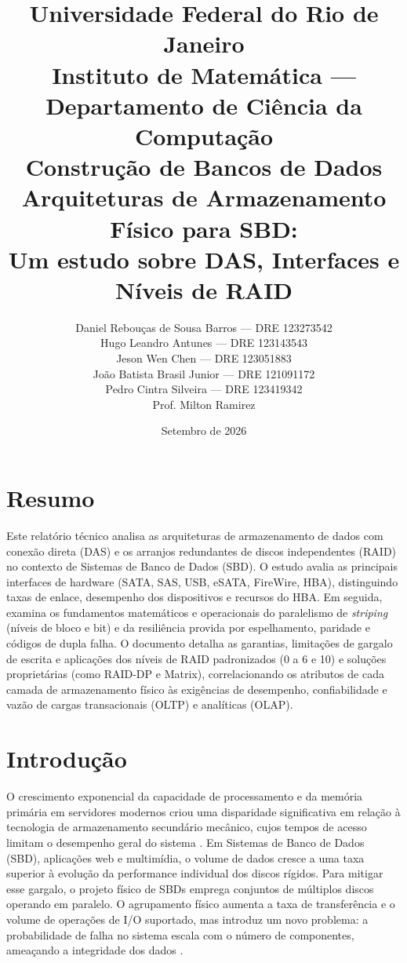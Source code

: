 \documentclass[titlepage]{article}
\title{
    \vspace{-1cm}
    {\large Universidade Federal do Rio de Janeiro}\\
    {\large Instituto de Matemática --- Departamento de Ciência da Computação}\\
    {\large Construção de Bancos de Dados}\\[1.5cm]
    \textbf{Arquiteturas de Armazenamento Físico para SBD:}\\
    \textbf{Um estudo sobre DAS, Interfaces e Níveis de RAID}
}
\author{
    Daniel Rebouças de Sousa Barros --- DRE 123273542 \\
    Hugo Leandro Antunes --- DRE 123143543 \\
    Jeson Wen Chen --- DRE 123051883 \\
    João Batista Brasil Junior --- DRE 121091172 \\
    Pedro Cintra Silveira --- DRE 123419342 \\[1.5cm]
    {\normalsize Prof. Milton Ramirez}
}
\date{Setembro de 2026}
\begin{document}
\maketitle

{\color{black}{\tableofcontents}}
\newpage

\section*{Resumo}
Este relatório técnico analisa as arquiteturas de armazenamento de dados com conexão direta (DAS) e os arranjos redundantes de discos independentes (RAID) no contexto de Sistemas de Banco de Dados (SBD). O estudo avalia as principais interfaces de hardware (SATA, SAS, USB, eSATA, FireWire, HBA), distinguindo taxas de enlace, desempenho dos dispositivos e recursos do HBA. Em seguida, examina os fundamentos matemáticos e operacionais do paralelismo de \textit{striping} (níveis de bloco e bit) e da resiliência provida por espelhamento, paridade e códigos de dupla falha. O documento detalha as garantias, limitações de gargalo de escrita e aplicações dos níveis de RAID padronizados (0 a 6 e 10) e soluções proprietárias (como RAID-DP e Matrix), correlacionando os atributos de cada camada de armazenamento físico às exigências de desempenho, confiabilidade e vazão de cargas transacionais (OLTP) e analíticas (OLAP).

\section{Introdução}
\label{sec:introducao}
O crescimento exponencial da capacidade de processamento e da memória primária em servidores modernos criou uma disparidade significativa em relação à tecnologia de armazenamento secundário mecânico, cujos tempos de acesso limitam o desempenho geral do sistema \cite{elmasri2016}. Em Sistemas de Banco de Dados (SBD), aplicações web e multimídia, o volume de dados cresce a uma taxa superior à evolução da performance individual dos discos rígidos. Para mitigar esse gargalo, o projeto físico de SBDs emprega conjuntos de múltiplos discos operando em paralelo. O agrupamento físico aumenta a taxa de transferência e o volume de operações de I/O suportado, mas introduz um novo problema: a probabilidade de falha no sistema escala com o número de componentes, ameaçando a integridade dos dados \cite{silberschatz2020}.
\end{document}
